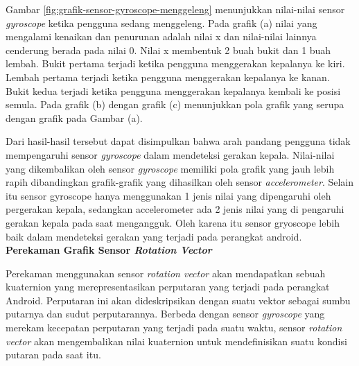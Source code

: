 \documentclass[a4paper,twoside]{article}
\begin{document}
\begin{enumerate}
Gambar \ref{fig:grafik-sensor-gyroscope-menggeleng} menunjukkan nilai-nilai sensor \textit{gyroscope} ketika pengguna sedang menggeleng. Pada grafik (a) nilai yang mengalami kenaikan dan penurunan adalah nilai x dan nilai-nilai lainnya cenderung berada pada nilai 0. Nilai x membentuk 2 buah bukit dan 1 buah lembah. Bukit pertama terjadi ketika pengguna menggerakan kepalanya ke kiri. Lembah pertama terjadi ketika pengguna menggerakan kepalanya ke kanan. Bukit kedua terjadi ketika pengguna menggerakan kepalanya kembali ke posisi semula. Pada grafik (b) dengan grafik (c) menunjukkan pola grafik yang serupa dengan grafik pada Gambar (a).

Dari hasil-hasil tersebut dapat disimpulkan bahwa arah pandang pengguna tidak mempengaruhi sensor \textit{gyroscope} dalam mendeteksi gerakan kepala. Nilai-nilai yang dikembalikan oleh sensor \textit{gyroscope} memiliki  pola grafik yang jauh lebih rapih dibandingkan grafik-grafik yang dihasilkan oleh sensor \textit{accelerometer}. Selain itu sensor gyroscope hanya menggunakan 1 jenis nilai yang dipengaruhi oleh pergerakan kepala, sedangkan accelerometer ada 2 jenis nilai yang di pengaruhi gerakan kepala pada saat mengangguk. Oleh karena itu sensor gryoscope lebih baik dalam mendeteksi gerakan yang terjadi pada perangkat android.\\

\textbf{Perekaman Grafik Sensor \textit{Rotation Vector}}\\

\label{sec:analisis_grafik_sensor_rotation_vector}

Perekaman menggunakan sensor \textit{rotation vector} akan mendapatkan sebuah kuaternion yang merepresentasikan perputaran yang terjadi pada perangkat Android. Perputaran ini akan dideskripsikan dengan suatu vektor sebagai sumbu putarnya dan sudut perputarannya. Berbeda dengan sensor \textit{gyroscope} yang merekam kecepatan perputaran yang terjadi pada suatu waktu, sensor \textit{rotation vector} akan mengembalikan nilai kuaternion untuk mendefinisikan suatu kondisi putaran pada saat itu. 


\end{enumerate}
\end{document}
